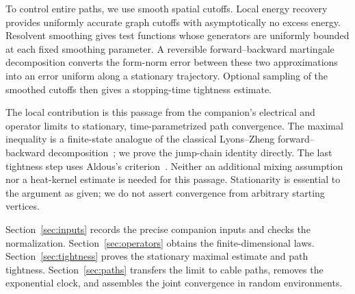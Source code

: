 To control entire paths, we use smooth spatial cutoffs. Local energy
recovery provides uniformly accurate graph cutoffs with asymptotically
no excess energy. Resolvent smoothing gives test functions whose
generators are uniformly bounded at each fixed smoothing parameter.
A reversible forward--backward martingale decomposition converts the
form-norm error between these two approximations into an error uniform
along a stationary trajectory. Optional sampling of the smoothed
cutoffs then gives a stopping-time tightness estimate.

The local contribution is this passage from the companion's electrical
and operator limits to stationary, time-parametrized path convergence.
The maximal inequality is a finite-state analogue of the classical
Lyons--Zheng forward--backward
decomposition~\cite{LyonsZheng1988}; we prove the jump-chain identity
directly. The last tightness step uses Aldous's
criterion~\cite{Aldous1978}.
Neither an additional mixing assumption nor a heat-kernel estimate is
needed for this passage. Stationarity is essential to the argument as
given; we do not assert convergence from arbitrary starting vertices.

Section~\ref{sec:inputs} records the precise companion inputs and checks
the normalization. Section~\ref{sec:operators} obtains the
finite-dimensional laws. Section~\ref{sec:tightness} proves the stationary
maximal estimate and path tightness. Section~\ref{sec:paths} transfers the
limit to cable paths, removes the exponential clock, and assembles the
joint convergence in random environments.
